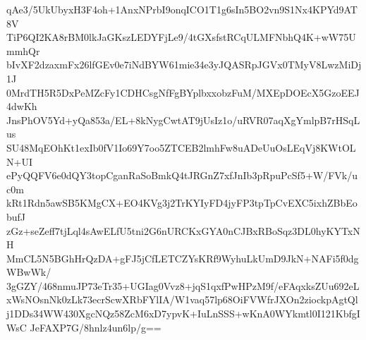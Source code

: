 qAe3/5UkUbyxH3F4oh+1AnxNPrbI9onqICO1T1g6sIn5BO2vn9S1Nx4KPYd9AT8V
TiP6QI2KA8rBM0lkJaGKszLEDYFjLe9/4tGXsfstRCqULMFNbhQ4K+wW75UmmhQr
bIvXF2dzaxmFx26lfGEv0e7iNdBYW61mie34e3yJQASRpJGVx0TMyV8LwzMiDj1J
0MrdTH5R5DxPeMZcFy1CDHCsgNfFgBYplbxxobzFuM/MXEpDOEcX5GzoEEJ4dwKh
JnsPhOV5Yd+yQa853a/EL+8kNygCwtAT9jUsIz1o/uRVR07aqXgYmlpB7rHSqLus
SU48MqEOhKt1exIb0fV1Io69Y7oo5ZTCEB2lmhFw8uADeUuOsLEqVj8KWtOLN+UI
ePyQQFV6e0dQY3topCganRaSoBmkQ4tJRGnZ7xfJnIb3pRpuPcSf5+W/FVk/uc0m
kRt1Rdn5awSB5KMgCX+EO4KVg3j2TrKYIyFD4jyFP3tpTpCvEXC5ixhZBbEobufJ
zGz+seZeff7tjLql4sAwELfU5tni2G6nURCKxGYA0nCJBxRBoSqz3DL0hyKYTxNH
MmCL5N5BGhHrQzDA+gFJ5jCfLETCZYsKRf9WyhuLkUmD9JkN+NAFi5f0dgWBwWk/
3gGZY/468nmuJP73eTr35+UGIag0Vvz8+jqS1qxfPwHPzM9f/eFAqxksZUu692eL
xWsNOsnNk0zLk73ecrScwXRbFYlIA/W1vaq57lp68OiFVWfrJXOn2ziockpAgtQl
j1DDs34WW430XgcNQz58ZcM6xD7ypvK+IuLnSSS+wKnA0WYkmtl0I121KbfgIWsC
JeFAXP7G/8hnlz4un6lp/g==

